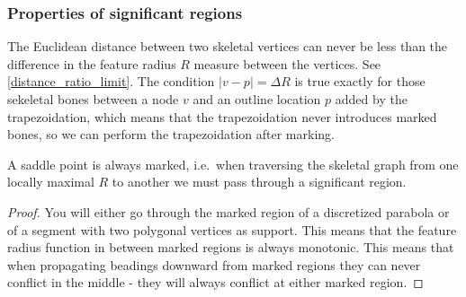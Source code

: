 \subsubsection{Properties of significant regions}
The Euclidean distance between two skeletal vertices can never be less than the difference in the feature radius $R$ measure between the vertices.
See \cref{distance_ratio_limit}.
The condition $|v - p| = \Delta R$ is true exactly for those sekeletal bones between a node $v$ and an outline location $p$ added by the trapezoidation, which means that the trapezoidation never introduces marked bones, so we can perform the trapezoidation after marking.

\begin{lemma}\label{saddle_points_are_marked}
A saddle point is always marked, i.e.\
when traversing the skeletal graph from one locally maximal $R$ to another we must pass through a significant region.
\end{lemma}
\begin{proof}
You will either go through the marked region of a discretized parabola or of a segment with two polygonal vertices as support.
This means that the feature radius function in between marked regions is always monotonic.
This means that when propagating beadings downward from marked regions they can never conflict in the middle - they will always conflict at either marked region.
\end{proof}


